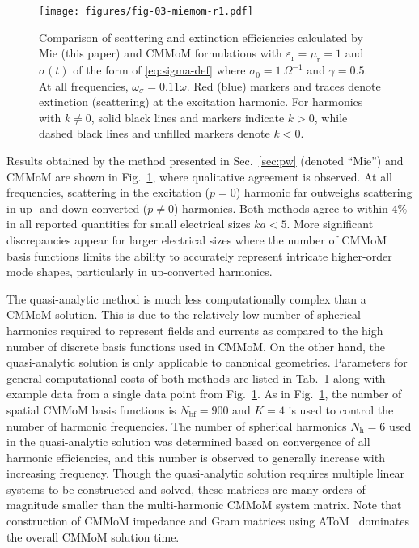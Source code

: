\documentclass[article]{IEEEtran}
\newcommand{\T}[1]{\mathrm{#1}}
\begin{document}
\begin{figure}
    \centering
    \texttt{[image: figures/fig-03-miemom-r1.pdf]}
    \caption{Comparison of scattering and extinction efficiencies calculated by Mie (this paper) and CMMoM formulations with $\varepsilon_\T{r} = \mu_\T{r} = 1$ and $\sigma(t)$ of the form of \eqref{eq:sigma-def} where $\sigma_0 = 1~\Omega^{-1}$ and $\gamma = 0.5$.  At all frequencies, $\omega_\sigma = 0.11\omega$.  Red (blue) markers and traces denote extinction (scattering) at the excitation harmonic.  For harmonics with $k\neq 0$, solid black lines and markers indicate $k>0$, while dashed black lines and unfilled markers denote $k<0$.}
    \label{fig:mie-mom-comparison}
\end{figure}

Results obtained by the method presented in Sec.~\ref{sec:pw} (denoted ``Mie'') and CMMoM are shown in Fig.~\ref{fig:mie-mom-comparison}, where qualitative agreement is observed.  At all frequencies, scattering in the excitation ($p=0$) harmonic far outweighs scattering in up- and down-converted ($p\neq0$) harmonics.  Both methods agree to within $4\%$ in all reported quantities for small electrical sizes $ka<5$. More significant discrepancies appear for larger electrical sizes where the number of CMMoM basis functions limits the ability to accurately represent intricate higher-order mode shapes, particularly in up-converted harmonics. 

The quasi-analytic method is much less computationally complex than a CMMoM solution.  This is due to the relatively low number of spherical harmonics required to represent fields and currents as compared to the high number of discrete basis functions used in CMMoM. On the other hand, the quasi-analytic solution is only applicable to canonical geometries. Parameters for general computational costs of both methods are listed in Tab.~1 along with example data from a single data point from Fig.~\ref{fig:mie-mom-comparison}.  As in Fig.~\ref{fig:mie-mom-comparison}, the number of spatial CMMoM basis functions is $N_\T{bf} = 900$ and $K=4$ is used to control the number of harmonic frequencies.  The number of spherical harmonics $N_\T{h} = 6$ used in the quasi-analytic solution was determined based on convergence of all harmonic efficiencies, and this number is observed to generally increase with increasing frequency. Though the quasi-analytic solution requires multiple linear systems to be constructed and solved, these matrices are many orders of magnitude smaller than the multi-harmonic CMMoM system matrix.  Note that construction of CMMoM impedance and Gram matrices using AToM~\cite{atom} dominates the overall CMMoM solution time.
\end{document}
